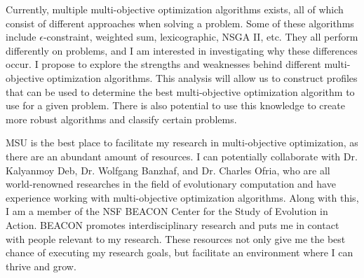 \documentclass[12pt]{report}
\begin{document}
Currently, multiple multi-objective optimization algorithms exists, all of which consist of different approaches when solving a problem.
Some of these algorithms include $\epsilon$-constraint, weighted sum, lexicographic, NSGA II, etc.
They all perform differently on problems, and I am interested in investigating why these differences occur. 
I propose to explore the strengths and weaknesses behind different multi-objective optimization algorithms. 
This analysis will allow us to construct profiles that can be used to determine the best multi-objective optimization algorithm to use for a given problem.
There is also potential to use this knowledge to create more robust algorithms and classify certain problems. 

MSU is the best place to facilitate my research in multi-objective optimization, as there are an abundant amount of resources. 
I can potentially collaborate with Dr. Kalyanmoy Deb, Dr. Wolfgang Banzhaf, and Dr. Charles Ofria, who are all world-renowned researches in the field of evolutionary computation and have experience working with multi-objective optimization algorithms. 
Along with this, I am a member of the NSF BEACON Center for the Study of Evolution in Action. 
BEACON promotes interdisciplinary research and puts me in contact with people relevant to my research.
These resources not only give me the best chance of executing my research goals, but facilitate an environment where I can thrive and grow. 
\end{document}
